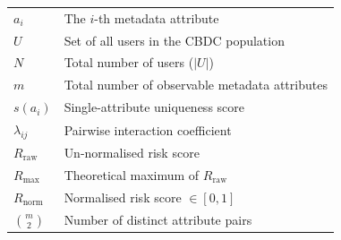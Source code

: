 \begin{longtable}{p{3.5cm} p{10cm}}
$a_i$                         & The $i$-th metadata attribute\\[0.4em]
$U$                           & Set of all users in the CBDC population\\[0.4em]
$N$                           & Total number of users ($|U|$)\\[0.4em]
$m$                           & Total number of observable metadata attributes\\[0.4em]
$s(a_i)$                      & Single-attribute uniqueness score\\[0.4em]
$\lambda_{ij}$                & Pairwise interaction coefficient\\[0.4em]
$R_{\mathrm{raw}}$            & Un-normalised risk score\\[0.4em]
$R_{\mathrm{max}}$            & Theoretical maximum of $R_{\mathrm{raw}}$\\[0.4em]
$R_{\mathrm{norm}}$           & Normalised risk score $\in [0,1]$\\[0.4em]
$\binom{m}{2}$                & Number of distinct attribute pairs\\[0.4em]
\end{longtable}